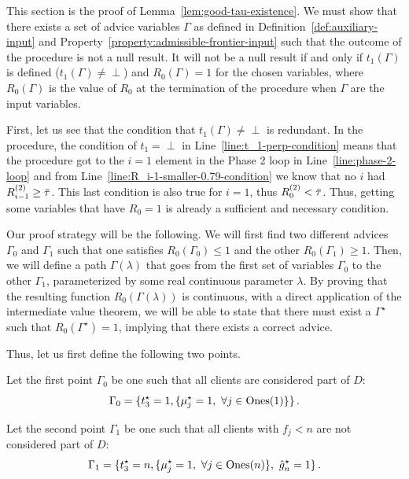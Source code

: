 

This section is the proof of Lemma~\ref{lem:good-tau-existence}. We must show that there exists a set of advice variables $\Gamma$ as defined in Definition~\ref{def:auxiliary-input} and Property~\ref{property:admissible-frontier-input} such that the outcome of the procedure is not a null result. 
It will not be a null result if and only if $t_1(\Gamma)$ is defined ($t_1(\Gamma)\neq \perp$) and $R_0(\Gamma)=1$ for the chosen variables, where $R_0(\Gamma)$ is the value of $R_0$ at the termination of the procedure when $\Gamma$ are the input variables.

First, let us see that the condition that $t_1(\Gamma)\neq \perp$ is redundant. In the procedure, the condition of $t_1=\perp$ in Line~\ref{line:t_1-perp-condition} means that the procedure got to the $i=1$ element in the Phase 2 loop in Line~\ref{line:phase-2-loop} and from Line~\ref{line:R_i-1-smaller-0.79-condition} we know that no $i$ had $R_{i-1}^{(2)}\ge \bar\tau$. This last condition is also true for $i=1$, thus $R_0^{(2)}< \bar\tau$. Thus, getting some variables that have $R_0=1$ is already a sufficient and necessary condition.

Our proof strategy will be the following. We will first find two different advices $\Gamma_0$ and $\Gamma_1$ such that one satisfies $R_0(\Gamma_0)\leq 1$ and the other $R_0(\Gamma_1)\geq 1$. Then, we will define a path $\Gamma(\lambda)$ that goes from the first set of variables $\Gamma_0$ to the other $\Gamma_1$, parameterized by some real continuous parameter $\lambda$. By proving that the resulting function $R_0(\Gamma(\lambda))$ is continuous, with a direct application of the intermediate value theorem, we will be able to state that there must exist a $\Gamma^\star$ such that $R_0(\Gamma^\star)=1$, implying that there exists a correct advice.

Thus, let us first define the following two points.
\begin{definition}
    Let the first point $\Gamma_0$ be one such that all clients are considered part of $D$:
    \begin{equation*}
        \Gamma_0 = \{t_3^\star=1, \{\mu_j^\star=1, \ \forall j \in \text{Ones}(1)\}\}\,.
    \end{equation*}
\end{definition}
\begin{definition}
    Let the second point $\Gamma_1$ be one such that all clients with $f_j<n$ are not considered part of $D$:
    \begin{equation*}
        \Gamma_1 = \{t_3^\star = n, \{\mu_j^\star=1, \ \forall j \in \ones{n}\}, \ \hg_n^\star=1\}\,.
    \end{equation*}
\end{definition}

